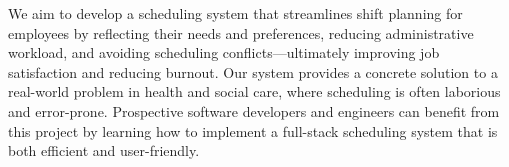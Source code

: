 \documentclass[nomenclature, english, bibtex]{kththesis}
\begin{document}

We aim to develop a scheduling system that streamlines shift planning for employees by reflecting their needs and preferences, reducing administrative workload, and avoiding scheduling conflicts—ultimately improving job satisfaction and reducing burnout. Our system provides a concrete solution to a real-world problem in health and social care, where scheduling is often laborious and error-prone. Prospective software developers and engineers can benefit from this project by learning how to implement a full-stack scheduling system that is both efficient and user-friendly.




\end{document}
